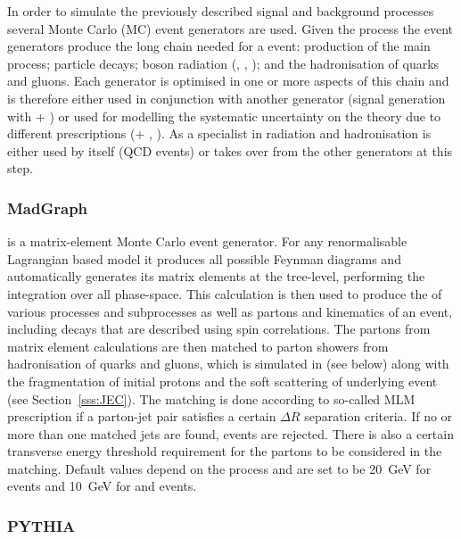 In order to simulate the previously described signal and background processes several Monte Carlo (MC) event generators
are used. Given the process the event generators produce the long chain needed for a event: production of the main
process; particle decays; boson radiation (\Z, \photon, \cPg); and the hadronisation of quarks and gluons. Each
generator is optimised in one or more aspects of this chain and is therefore either used in conjunction with another
generator (signal generation with \MADGRAPH + \PYTHIA) or used for modelling the systematic uncertainty on the theory
due to different prescriptions (\POWHEG + \PYTHIA, \MCATNLO). As a specialist in radiation and hadronisation \PYTHIA is
either used by itself (QCD \multijet events) or takes over from the other generators at this step.

\subsubsection*{MadGraph}

\MADGRAPH \autocite{MadGraph} is a matrix-element Monte Carlo event generator. For any renormalisable Lagrangian based
model it produces all possible Feynman diagrams and automatically generates its matrix elements at the tree-level,
performing the integration over all phase-space. This calculation is then used to produce the \xsect of various
processes and subprocesses as well as partons and kinematics of an event, including decays that are described using spin
correlations. The partons from matrix element calculations are then matched to parton showers from hadronisation of
quarks and gluons, which is simulated in \PYTHIA (see below) along with the fragmentation of initial protons and the
soft scattering of underlying event (see Section~\ref{sss:JEC}). The matching is done according to so-called MLM
prescription \autocite{MLM} if a parton-jet pair satisfies a certain $\Delta R$ separation criteria. If no or more than
one matched jets are found, events are rejected. There is also a certain transverse energy threshold requirement for the
partons to be considered in the matching. Default values depend on the process and are set to be \SI{20}{\GeV} for
\ttbar events and \SI{10}{\GeV} for \WpJets and \ZpJets events.


\subsubsection*{PYTHIA} 

